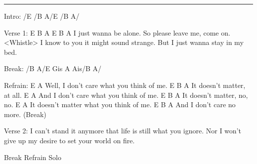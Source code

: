 \noindent\rule{\columnwidth}{1pt}

\begin{lstsong}
Intro: /E  /B  A/E   /B  A/

Verse 1:
E       B       A     E B A
I just wanna be alone.
So please leave me, come on.
<Whistle>
I know to you it might sound strange.
But I just wanna stay in my bed.

Break: /B   A/E    Gis A Ais/B   A/

Refrain:
      E                     A
Well, I don't care what you think of me.
   E               B  A
It doesn't matter, at all.
    E                     A
And I don't care what you think of me.
   E               B   A
It doesn't matter, no, no.
   E                       A
It doesn't matter what you think of me.
    E            B  A
And I don't care no more. (Break)

Verse 2:
I can't stand it anymore
that life is still what you ignore.
Nor I won't give up my desire
to set your world on fire.

Break
Refrain
Solo
\end{lstsong}
\newpage